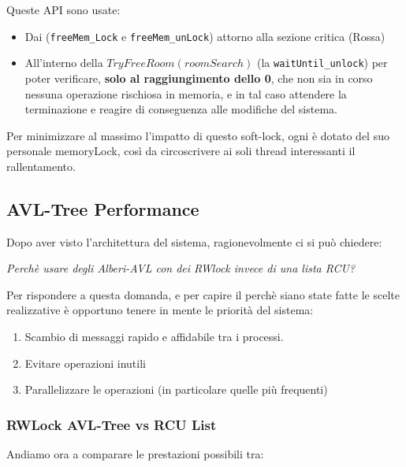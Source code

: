 Queste API sono usate:
\begin{itemize}
\item
Dai \Reader (\verb|freeMem_Lock| e \verb|freeMem_unLock|) attorno alla sezione critica ({\color{red}Rossa})

\item
All'interno della {\color{blue}$TryFreeRoom(roomSearch)$} (la \verb|waitUntil_unlock|) per poter verificare,
\textbf{solo al raggiungimento dello 0}, che non sia in corso nessuna operazione rischiosa in memoria, e in tal caso
attendere la terminazione e reagire di conseguenza alle modifiche del sistema.
\end{itemize}

Per minimizzare al massimo l'impatto di questo soft-lock, ogni \Topic è dotato del suo personale memoryLock, così da
circoscrivere ai soli thread interessanti il rallentamento.


\subsection{AVL-Tree Performance} \label{treePerf}
Dopo aver visto l'architettura del sistema, ragionevolmente ci si può chiedere:

\begin{center}
\textit{Perchè usare degli Alberi-AVL con dei RWlock invece di una lista RCU?}
\end{center}

Per rispondere a questa domanda, e per capire il perchè siano state fatte le scelte realizzative è opportuno tenere in
mente le priorità del sistema:

\begin{enumerate}
 \item Scambio di messaggi rapido e affidabile tra i processi.
 \item Evitare operazioni inutili
 \item Parallelizzare le operazioni (in particolare quelle più frequenti)
\end{enumerate}

\subsubsection{RWLock AVL-Tree vs RCU List} \label{AVL_Vs_RCUList}

Andiamo ora a comparare le prestazioni possibili tra:

